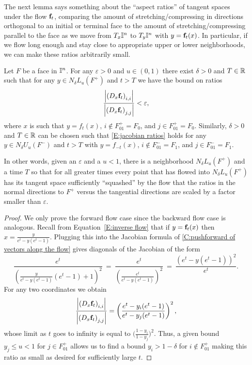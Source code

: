 The next lemma says something about the ``aspect ratios'' of tangent spaces under the flow $\mathbf{f}_t$, comparing the amount of stretching/compressing in directions orthogonal to an initial or terminal face to the amount of stretching/compressing parallel to the face as we move from $T_x\mathbb{I}^n$ to $T_{y}\mathbb{I}^n$ with $y=\mathbf{f}_t(x)$.
In particular, if we flow long enough and stay close to appropriate upper or lower neighborhoods, we can make these ratios arbitrarily small.

\begin{lemma}\label{L:jacobian ratios}
	Let $F$ be a face in $\mathbb{I}^n$.
	For any $\varepsilon > 0$ and $u \in (0,1)$ there exist $\delta > 0$ and $T\in \mathbb{R}$ such that for any $y \in N_\delta L_u(F^+)$ and $t>T$ we have the bound on ratios
	\begin{equation}\label{E:jacobian ratios}
		\frac{\left|\left(D_{x}\mathbf{f}_t\right)_{i,i}\right|}
		{\left|\left(D_{x}\mathbf{f}_t\right)_{j,j}\right|} < \varepsilon,
	\end{equation}
	where $x$ is such that $y = f_t(x)$, $i \not\in F^+_{01} = F_0$, and $j \in F^+_{01} = F_0$.
	Similarly, $\delta > 0$ and $T\in \mathbb{R}$ can be chosen such that \eqref{E:jacobian ratios} holds for any $y \in N_\delta U_u(F^-)$ and $t>T$ with $y = f_{-t}(x)$, $i \not\in F^-_{01} = F_1$, and $j \in F^-_{01} = F_1$.
\end{lemma}

In other words, given an $\varepsilon$ and a $u< 1$, there is a neighborhood $N_\delta L_u(F^+)$ and a time $T$ so that for all greater times every point that has flowed into $N_\delta L_u(F^+)$ has its tangent space sufficiently
``squashed'' by the flow that the ratios in the normal directions to $F^+$ versus the tangential directions are scaled by a factor smaller than $\varepsilon$.

\begin{proof}
	We only prove the forward flow case since the backward flow case is analogous.
	Recall from Equation~\eqref{E:inverse flow} that if $y = \mathbf{f}_t(x)$ then $x = \frac{y}{e^t-y(e^t-1)}$.
	Plugging this into the Jacobian formula of \cref{C:pushforward of vectors along the flow} gives diagonals of the Jacobian of the form
	\begin{equation*}
		\frac{e^t}{\left(\frac{y}{e^t-y(e^t-1)}(e^t -1) + 1\right)^2} \ = \
		\frac{e^t}{\left(\frac{e^t}{e^t-y(e^t-1)}\right)^2} \ = \
		\frac{\left(e^t-y(e^t-1)\right)^2}{e^t}.
	\end{equation*}
	For any two coordinates we obtain
	\begin{equation*}
		\frac{\left|\left(D_{x}\mathbf{f}_t\right)_{i,i}\right|}
		{\left|\left(D_{x}\mathbf{f}_t\right)_{j,j}\right|} = \left(\frac{e^t-y_i(e^t-1)}{e^t-y_j(e^t-1)}\right)^2,
	\end{equation*}
	whose limit as $t$ goes to infinity is equal to $\big(\frac{1-y_i}{1-y_j}\big)^2$.
	Thus, a given bound $y_j \leq u<1$ for $j \in F^+_{01}$ allows us to find a bound $y_i > 1- \delta$ for $i \not\in F^+_{01}$ making this ratio as small as desired for sufficiently large $t$.
\end{proof}

